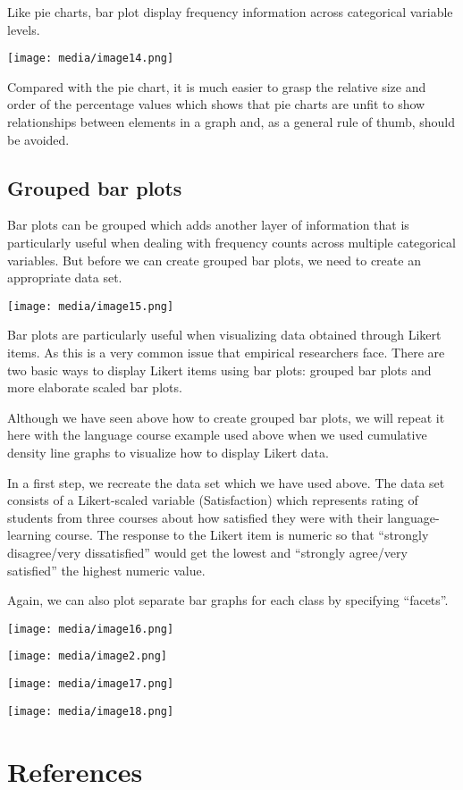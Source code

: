 Like pie charts, bar plot display frequency information across
categorical variable levels.

\texttt{[image: media/image14.png]}

Compared with the pie chart, it is much easier to grasp the relative
size and order of the percentage values which shows that pie charts are
unfit to show relationships between elements in a graph and, as a
general rule of thumb, should be avoided.

\hypertarget{grouped-bar-plots}{%
\subsection{Grouped bar plots}\label{grouped-bar-plots}}

Bar plots can be grouped which adds another layer of information that is
particularly useful when dealing with frequency counts across multiple
categorical variables. But before we can create grouped bar plots, we
need to create an appropriate data set.

\texttt{[image: media/image15.png]}

Bar plots are particularly useful when visualizing data obtained through
Likert items. As this is a very common issue that empirical researchers
face. There are two basic ways to display Likert items using bar plots:
grouped bar plots and more elaborate scaled bar plots.

Although we have seen above how to create grouped bar plots, we will
repeat it here with the language course example used above when we used
cumulative density line graphs to visualize how to display Likert data.

In a first step, we recreate the data set which we have used above. The
data set consists of a Likert-scaled variable (Satisfaction) which
represents rating of students from three courses about how satisfied
they were with their language-learning course. The response to the
Likert item is numeric so that ``strongly disagree/very dissatisfied''
would get the lowest and ``strongly agree/very satisfied'' the highest
numeric value.

Again, we can also plot separate bar graphs for each class by specifying
``facets''.

\texttt{[image: media/image16.png]}

\texttt{[image: media/image2.png]}

\texttt{[image: media/image17.png]}

\texttt{[image: media/image18.png]}

\hypertarget{references}{%
\section{References}\label{references}}